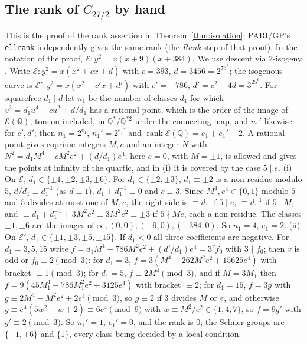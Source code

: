 \documentclass[pdflatex,sn-mathphys-num]{sn-jnl}
\theoremstyle{thmstyleone}%
\theoremstyle{thmstylethree}%
\newcommand{\Q}{\mathbb{Q}}
\begin{document}
\begin{appendices}
\section{The rank of $C_{27/2}$ by hand}\label{app:descent}

This is the proof of the rank assertion in Theorem~\ref{thm:isolation}; PARI/GP's \texttt{ellrank} independently gives the same rank (the \emph{Rank} step of that proof). In the notation of the proof, $\mathcal E:y^2=x(x+9)(x+384)$. We use descent via $2$-isogeny \cite[\S3.6, Method~1 and (3.6.2)]{cremona1997}. Write $\mathcal E:y^2=x(x^2+cx+d)$ with $c=393$, $d=3456=2^73^3$; the isogenous curve is $\mathcal E':y^2=x(x^2+c'x+d')$ with $c'=-786$, $d'=c^2-4d=3^25^6$. For squarefree $d_1\mid d$ let $n_1$ be the number of classes $d_1$ for which $v^2=d_1u^4+cu^2+d/d_1$ has a rational point, which is the order of the image of $\mathcal E(\Q)$, torsion included, in $\Q^*/\Q^{*2}$ under the connecting map, and $n_1'$ likewise for $c',d'$; then $n_1=2^{e_1}$, $n_1'=2^{e_1'}$ and $\operatorname{rank}\mathcal E(\Q)=e_1+e_1'-2$. A rational point gives coprime integers $M,e$ and an integer $N$ with $N^2=d_1M^4+cM^2e^2+(d/d_1)e^4$; here $e=0$, with $M=\pm1$, is allowed and gives the points at infinity of the quartic, and in (i) it is covered by the case $5\mid e$.
(i) On $\mathcal E$, $d_1\in\{\pm1,\pm2,\pm3,\pm6\}$. For $d_1\in\{\pm2,\pm3\}$, $d_1\equiv\pm2$ is a non-residue modulo $5$, $d/d_1\equiv d_1^{-1}$ (as $d\equiv1$), $d_1+d_1^{-1}\equiv0$ and $c\equiv3$. Since $M^4,e^4\in\{0,1\}$ modulo $5$ and $5$ divides at most one of $M,e$, the right side is $\equiv d_1$ if $5\mid e$, $\equiv d_1^{-1}$ if $5\mid M$, and $\equiv d_1+d_1^{-1}+3M^2e^2\equiv3M^2e^2\equiv\pm3$ if $5\nmid Me$, each a non-residue. The classes $\pm1,\pm6$ are the images of $\infty,(0,0),(-9,0),(-384,0)$. So $n_1=4$, $e_1=2$.
(ii) On $\mathcal E'$, $d_1\in\{\pm1,\pm3,\pm5,\pm15\}$. If $d_1<0$ all three coefficients are negative. For $d_1=3,5,15$ write $f=d_1M^4-786M^2e^2+(d'/d_1)e^4=3^vf_0$ with $3\nmid f_0$; then $v$ is odd or $f_0\equiv2\pmod3$: for $d_1=3$, $f=3(M^4-262M^2e^2+15625e^4)$ with bracket $\equiv1\pmod3$; for $d_1=5$, $f\equiv2M^4\pmod3$, and if $M=3M_1$ then $f=9(45M_1^4-786M_1^2e^2+3125e^4)$ with bracket $\equiv2$; for $d_1=15$, $f=3g$ with $g\equiv2M^4-M^2e^2+2e^4\pmod3$, so $g\equiv2$ if $3$ divides $M$ or $e$, and otherwise $g\equiv e^4(5w^2-w+2)\equiv6e^4\pmod9$ with $w\equiv M^2/e^2\in\{1,4,7\}$, so $f=9g'$ with $g'\equiv2\pmod3$. So $n_1'=1$, $e_1'=0$, and the rank is $0$; the Selmer groups are $\{\pm1,\pm6\}$ and $\{1\}$, every class being decided by a local condition.

\end{appendices}


\end{document}
